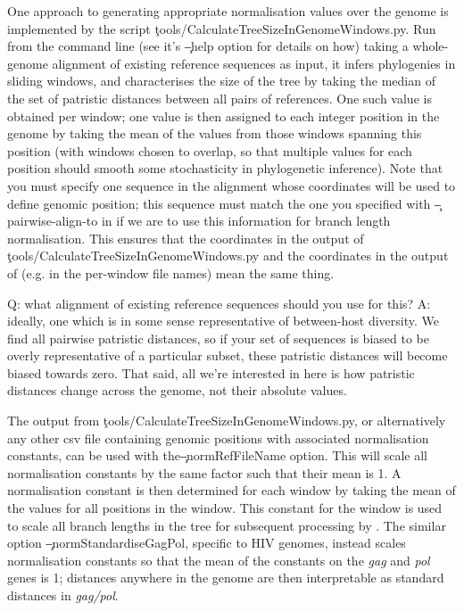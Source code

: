 One approach to generating appropriate normalisation values over the genome is implemented by the script \c{tools/CalculateTreeSizeInGenomeWindows.py}.
Run from the command line (see it's \c{--help} option for details on how) taking a whole-genome alignment of existing reference sequences as input, it infers phylogenies in sliding windows, and characterises the size of the tree by taking the median of the set of patristic distances between all pairs of references.
One such value is obtained per window; one value is then assigned to each integer position in the genome by taking the mean of the values from those windows spanning this position (with windows chosen to overlap, so that multiple values for each position should smooth some stochasticity in phylogenetic inference).
Note that you must specify one sequence in the alignment whose coordinates will be used to define genomic position; this sequence must match the one you specified with \c{--pairwise-align-to} in \pmt if we are to use this information for branch length normalisation.
This ensures that the coordinates in the output of \c{tools/CalculateTreeSizeInGenomeWindows.py} and the coordinates in the output of \pmt (e.g. in the per-window file names) mean the same thing.

Q: what alignment of existing reference sequences should you use for this?
A: ideally, one which is in some sense representative of between-host diversity.
We find all pairwise patristic distances, so if your set of sequences is biased to be overly representative of a particular subset, these patristic distances will become biased towards zero.
That said, all we're interested in here is how patristic distances change across the genome, not their absolute values.

The output from \c{tools/CalculateTreeSizeInGenomeWindows.py}, or alternatively any other csv file containing genomic positions with associated normalisation constants, can be used with the\break \c{--normRefFileName} option.
This will scale all normalisation constants by the same factor such that their mean is 1.
A normalisation constant is then determined for each window by taking the mean of the values for all positions in the window.
This constant for the window is used to scale all branch lengths in the tree for subsequent processing by \pat.
The similar option \c{--normStandardiseGagPol}, specific to HIV genomes, instead scales normalisation constants so that the mean of the constants on the {\it gag} and {\it pol} genes is 1; distances anywhere in the genome are then interpretable as standard distances in {\it gag/pol}.

